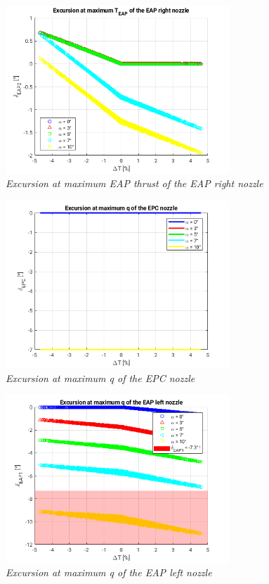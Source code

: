 \documentclass[12pt,fleqn,openany]{book} %
\begin{document}
\begin{figure}[h]
 \centering
 \includegraphics[width=0.75\textwidth]{emaxTr}
 \caption{\emph{Excursion at maximum EAP thrust of the EAP right nozzle}}
 \label{fig:emaxtr}
\end{figure}
 \begin{figure}[h]
 \centering
 \includegraphics[width=0.75\textwidth]{emaxq}
 \caption{\emph{Excursion at maximum q of the EPC nozzle}}
 \label{fig:emaxq}
\end{figure}
\begin{figure}[h]
 \centering
 \includegraphics[width=0.75\textwidth]{emaxql}
 \caption{\emph{Excursion at maximum q of the EAP left nozzle}}
 \label{fig:emaxql}
\end{figure}
\end{document}
